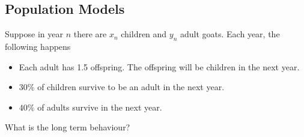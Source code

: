 \documentclass{article}
\begin{document}
\subsection{Population Models}
\begin{example}
  Suppose in year $n$ there are $x_n$ children and $y_n$ adult goats. Each year, the following happens
  \begin{itemize}
    \item Each adult has 1.5 offspring. The offspring will be children in the next year.
    \item $30\%$ of children survive to be an adult in the next year.
    \item $40\%$ of adults survive in the next year.
  \end{itemize}
  What is the long term behaviour?


\end{example}
\end{document}
